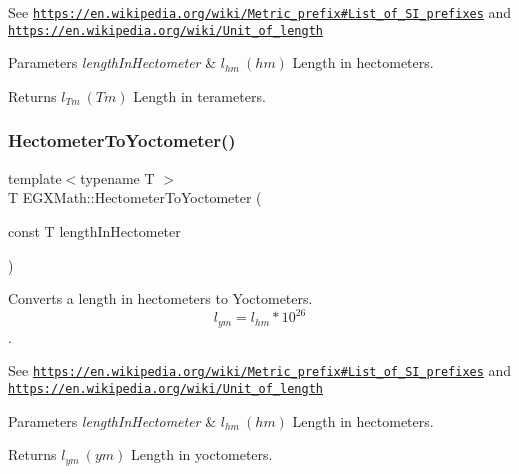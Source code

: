 See \href{https://en.wikipedia.org/wiki/Metric_prefix#List_of_SI_prefixes}{\tt https\+://en.\+wikipedia.\+org/wiki/\+Metric\+\_\+prefix\#\+List\+\_\+of\+\_\+\+S\+I\+\_\+prefixes} and \href{https://en.wikipedia.org/wiki/Unit_of_length}{\tt https\+://en.\+wikipedia.\+org/wiki/\+Unit\+\_\+of\+\_\+length} 
\begin{DoxyParams}{Parameters}
{\em length\+In\+Hectometer} & $ l_{hm}\ (hm)$ Length in hectometers. \\
\hline
\end{DoxyParams}
\begin{DoxyReturn}{Returns}
$ l_{Tm}\ (Tm)$ Length in terameters. 
\end{DoxyReturn}
\mbox{\label{group___e_g_x_math-_conversions-_length_conversions-_hectometer-_s_i_ga64c07f341a87b8ebd6a7c10129e3a924}} 
\subsubsection{\texorpdfstring{Hectometer\+To\+Yoctometer()}{HectometerToYoctometer()}}
{\footnotesize\ttfamily template$<$typename T $>$ \\
T E\+G\+X\+Math\+::\+Hectometer\+To\+Yoctometer (\begin{DoxyParamCaption}\item[{const T}]{length\+In\+Hectometer }\end{DoxyParamCaption})}



Converts a length in hectometers to Yoctometers. \[ l_{ym}=l_{hm} * 10^{26} \]. 

See \href{https://en.wikipedia.org/wiki/Metric_prefix#List_of_SI_prefixes}{\tt https\+://en.\+wikipedia.\+org/wiki/\+Metric\+\_\+prefix\#\+List\+\_\+of\+\_\+\+S\+I\+\_\+prefixes} and \href{https://en.wikipedia.org/wiki/Unit_of_length}{\tt https\+://en.\+wikipedia.\+org/wiki/\+Unit\+\_\+of\+\_\+length} 
\begin{DoxyParams}{Parameters}
{\em length\+In\+Hectometer} & $ l_{hm}\ (hm)$ Length in hectometers. \\
\hline
\end{DoxyParams}
\begin{DoxyReturn}{Returns}
$ l_{ym}\ (ym)$ Length in yoctometers. 
\end{DoxyReturn}
\mbox{\label{group___e_g_x_math-_conversions-_length_conversions-_hectometer-_s_i_ga6e5db7fe650b044f73f505673d7e484d}} 
